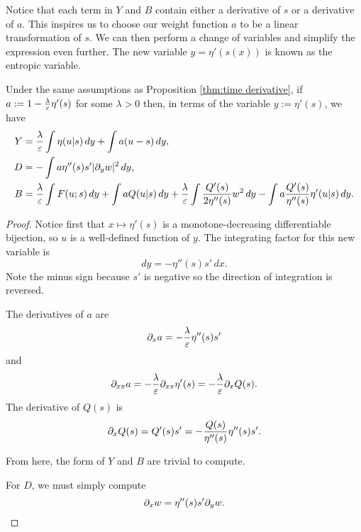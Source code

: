 
Notice that each term in $Y$ and $B$ contain either a derivative of $s$ or a derivative of $a$.  This inspires us to choose our weight function $a$ to be a linear transformation of $s$.  We can then perform a change of variables and simplify the expression even further.  The new variable $y = \eta'(s(x))$ is known as the entropic variable.  

\begin{lemma} \label{thm:rewrite time derivative}
Under the same assumptions as Proposition \ref{thm:time derivative}, if $a := 1 - \frac{\lambda}{\varepsilon} \eta'(s)$ for some $\lambda > 0$ then, in terms of the variable $y := \eta'(s)$, we have
\begin{align*} 
Y &= \frac{\lambda}{\varepsilon} \int \eta(u|s) \,dy + \int a (u-s) \,dy, \\
D &= -\int a \eta''(s) s' |\partial_y w|^2 \,dy, \\
B &= \frac{\lambda}{\varepsilon} \int F(u;s) \,dy + \int a Q(u|s) \,dy + \frac{\lambda}{\varepsilon}\int \frac{Q'(s)}{2\eta''(s)} w^2 \,dy - \int a \frac{Q'(s)}{\eta''(s)} \eta'(u|s) \,dy. 
\end{align*}
\end{lemma}

\begin{proof}
Notice first that $x \mapsto \eta'(s)$ is a monotone-decreasing differentiable bijection, so $u$ is a well-defined function of $y$.  The integrating factor for this new variable is 
\[ dy = -\eta''(s)s' \,dx. \]
Note the minus sign because $s'$ is negative so the direction of integration is reversed.  

The derivatives of $a$ are
\[ \partial_x a = - \frac{\lambda}{\varepsilon} \eta''(s) s' \]
and
\[ \partial_{xx}a = - \frac{\lambda}{\varepsilon} \partial_{xx} \eta'(s) = - \frac{\lambda}{\varepsilon} \partial_x Q(s). \]
The derivative of $Q(s)$ is
\[ \partial_x Q(s) = Q'(s) s' = - \frac{Q(s)}{\eta''(s)} \eta''(s) s'. \]

From here, the form of $Y$ and $B$ are trivial to compute.  

For $D$, we must simply compute
\[ \partial_x w = \eta''(s) s' \partial_y w. \]
\end{proof}


